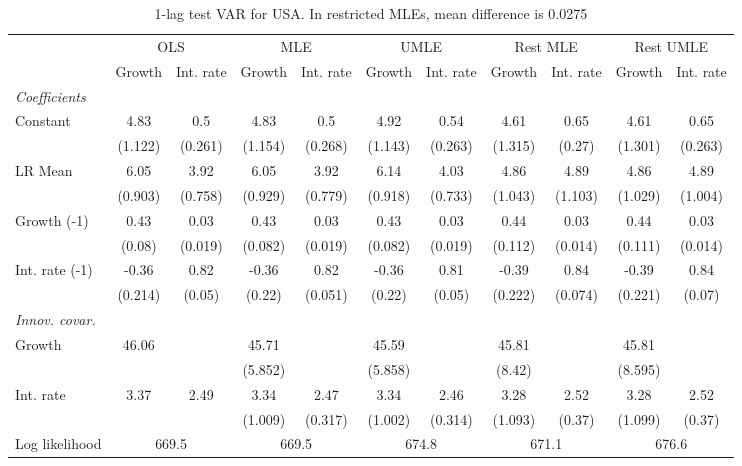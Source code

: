 \begin{table}[htbp] 
	\centering
	\begin{tabular}{@{\extracolsep{4pt}}lcccccccccc@{}}		\hline\hline
		 		 & \multicolumn{2}{c}{OLS} &\multicolumn{2}{c}{MLE} &\multicolumn{2}{c}{UMLE} &\multicolumn{2}{c}{Rest MLE} &\multicolumn{2}{c}{Rest UMLE} \\ 
 		 & Growth 	 & Int. rate 	 & Growth 	 & Int. rate 	 & Growth 	 & Int. rate 	 & Growth 	 & Int. rate 	 & Growth 	 & Int. rate\\\cline{2-3}\cline{4-5}\cline{6-7}\cline{8-9}\cline{10-11}
\rule{0pt}{4ex} 
 \emph{Coefficients} 	  		 & 		 & 		 & 		 & 		 & 		 & 		 & 		 & 		 & 		 &\\ 
\quad Constant 	 & 4.83 	 & 0.5 	 & 4.83 	 & 0.5 	 & 4.92 	 & 0.54 	 & 4.61 	 & 0.65 	 & 4.61 	 & 0.65	 \\ 
 		 & (1.122) 	 & (0.261) 	 & (1.154) 	 & (0.268) 	 & (1.143) 	 & (0.263) 	 & (1.315) 	 & (0.27) 	 & (1.301) 	 & (0.263) 	 \\ 
\quad LR Mean 	 & 6.05 	 & 3.92 	 & 6.05 	 & 3.92 	 & 6.14 	 & 4.03 	 & 4.86 	 & 4.89 	 & 4.86 	 & 4.89	 \\ 
 		 & (0.903) 	 & (0.758) 	 & (0.929) 	 & (0.779) 	 & (0.918) 	 & (0.733) 	 & (1.043) 	 & (1.103) 	 & (1.029) 	 & (1.004) 	 \\ 
\quad Growth (-1) 	 &0.43 	 & 0.03 	 & 0.43 	 & 0.03 	 & 0.43 	 & 0.03 	 & 0.44 	 & 0.03 	 & 0.44 	 & 0.03	 \\ 
 		 & (0.08) 	 & (0.019) 	 & (0.082) 	 & (0.019) 	 & (0.082) 	 & (0.019) 	 & (0.112) 	 & (0.014) 	 & (0.111) 	 & (0.014) 	 \\ 
\quad Int. rate (-1) 	 &-0.36 	 & 0.82 	 & -0.36 	 & 0.82 	 & -0.36 	 & 0.81 	 & -0.39 	 & 0.84 	 & -0.39 	 & 0.84	 \\ 
 		 & (0.214) 	 & (0.05) 	 & (0.22) 	 & (0.051) 	 & (0.22) 	 & (0.05) 	 & (0.222) 	 & (0.074) 	 & (0.221) 	 & (0.07) 	 \\ 
\rule{0pt}{4ex} \emph{Innov. covar.}  	 & 	 & 	 & 	 & 	 & 	 & 	 & 	 & 	 & 	 &\\ 
\quad Growth 	 &46.06 	 &  	 & 45.71 	 &  	 & 45.59 	 &  	 & 45.81 	 &  	 & 45.81 	 & 	 \\ 
 		 &  	 &  	 & (5.852) 	 &  	 & (5.858) 	 &  	 & (8.42) 	 &  	 & (8.595) 	 &  	 \\ 
\quad Int. rate 	 &3.37 	 & 2.49 	 & 3.34 	 & 2.47 	 & 3.34 	 & 2.46 	 & 3.28 	 & 2.52 	 & 3.28 	 & 2.52	 \\ 
 		 &  	 &  	 & (1.009) 	 & (0.317) 	 & (1.002) 	 & (0.314) 	 & (1.093) 	 & (0.37) 	 & (1.099) 	 & (0.37) 	 \\ 
 \hline \rule{0pt}{4ex} 
  Log likelihood 	 &\multicolumn{2}{c}{669.5} 	 & \multicolumn{2}{c}{669.5} 	 & \multicolumn{2}{c}{674.8} 	 & \multicolumn{2}{c}{671.1} 	 & \multicolumn{2}{c}{676.6}\\ 

 \hline 	\end{tabular}		\caption{1-lag test VAR for USA. In restricted MLEs, mean difference is 0.0275}
		\label{tab:USA1lag}

\end{table}